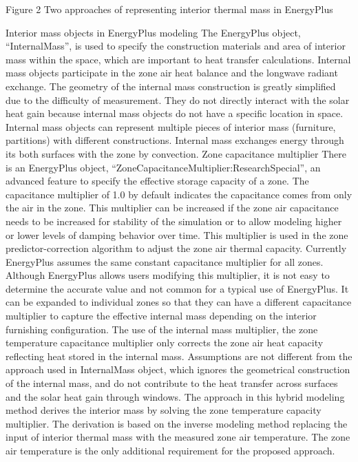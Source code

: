 Figure 2 Two approaches of representing interior thermal mass in EnergyPlus

Interior mass objects in EnergyPlus modeling
The EnergyPlus object, “InternalMass”, is used to specify the construction materials and area of interior mass within the space, which are important to heat transfer calculations. Internal mass objects participate in the zone air heat balance and the longwave radiant exchange. The geometry of the internal mass construction is greatly simplified due to the difficulty of measurement. They do not directly interact with the solar heat gain because internal mass objects do not have a specific location in space. Internal mass objects can represent multiple pieces of interior mass (furniture, partitions) with different constructions. Internal mass exchanges energy through its both surfaces with the zone by convection. 
Zone capacitance multiplier
There is an EnergyPlus object, “ZoneCapacitanceMultiplier:ResearchSpecial”, an advanced feature to specify the effective storage capacity of a zone. The capacitance multiplier of 1.0 by default indicates the capacitance comes from only the air in the zone. This multiplier can be increased if the zone air capacitance needs to be increased for stability of the simulation or to allow modeling higher or lower levels of damping behavior over time. This multiplier is used in the zone predictor-correction algorithm to adjust the zone air thermal capacity. Currently EnergyPlus assumes the same constant capacitance multiplier for all zones. Although EnergyPlus allows users modifying this multiplier, it is not easy to determine the accurate value and not common for a typical use of EnergyPlus. It can be expanded to individual zones so that they can have a different capacitance multiplier to capture the effective internal mass depending on the interior furnishing configuration. 
The use of the internal mass multiplier, the zone temperature capacitance multiplier only corrects the zone air heat capacity reflecting heat stored in the internal mass. Assumptions are not different from the approach used in InternalMass object, which ignores the geometrical construction of the internal mass, and do not contribute to the heat transfer across surfaces and the solar heat gain through windows.  The approach in this hybrid modeling method derives the interior mass by solving the zone temperature capacity multiplier. The derivation is based on the inverse modeling method replacing the input of interior thermal mass with the measured zone air temperature. The zone air temperature is the only additional requirement for the proposed approach.
